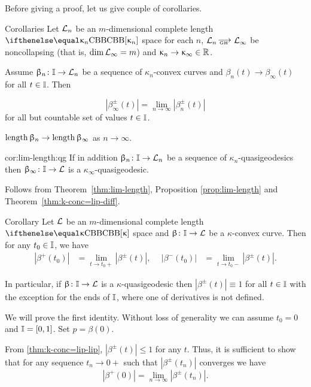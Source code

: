 Before giving a proof, let us give couple of corollaries. 

\begin{thm}{Corollaries}\label{cor:lim-length}
Let 
$\mathcal{L}_n$ be an $m$-dimensional complete length $\Alex{\kappa_n}$ space for each $n$, 
$\spc{L}_n\GHto \spc{L}_\infty$  be noncollapsing (that is, $\mathop{\rm dim}\nolimits\mathcal{L}_\infty=m$)
and $\kappa_n\to\kappa_\infty\in\RR$.

Assume $\beta_n\:\II\to \spc{L}_n$ be a sequence of $\kappa_n$-convex curves
and $\beta_n(t)\to \beta_\infty(t)$ for all $t\in\II$.
Then
\begin{subthm}{}
\[|\beta_\infty^\pm(t)|
=
\lim_{n\to\infty}|\beta_n^\pm(t)|\]
for all but countable set of values $t\in\II$.
\end{subthm}

\begin{subthm}{}
$\length\beta_n\to\length\beta_\infty$ as $n\to\infty$.
\end{subthm}

\begin{subthm}{cor:lim-length:qg}
If in addition $\beta_n\:\II\to \spc{L}_n$ be a sequence of $\kappa_n$-quasigeodesics
then $\beta_\infty\:\II\to \spc{L}$ is a $\kappa_\infty$-quasigeodesic.
\end{subthm}
\end{thm}

Follows from Theorem~\ref{thm:lim-length},
Proposition \ref{prop:lim-length} 
and Theorem~\ref{thm:k-conc=lip-diff}.
\qeds

\begin{thm}{Corollary}\label{cor:one-side-cont}\label{cor:|gamma'|=1}
Let $\mathcal{L}$ be an $m$-dimensional complete length $\Alex{\kappa}$ space
and $\beta\:\II\to \spc{L}$ be a $\kappa$-convex curve.
Then for any $t_0\in \II$, we have
\begin{align*}
|\beta^+(t_0)| &= \lim_{t\to t_0+}|\beta^\pm(t)|,\ \ &|\beta^-(t_0)| &= \lim_{t\to t_0-}|\beta^\pm(t)|.
\end{align*}

In particular, if $\beta\:\II\to \spc{L}$ is a $\kappa$-quasigeodesic then $|\beta^\pm(t)|\equiv1$ for all $t\in \II$ 
with the exception for the ends of $\mathbb{I}$, 
where one of derivatives is not defined.
\end{thm}

We will prove the first identity.
Without loss of generality we can assume $t_0=0$ and $\mathbb{I}=[0,1]$.
Set $p=\beta(0)$.

From \ref{thm:k-conc=lip-lip}, $|\beta^\pm(t)|\le 1$ for any $t$. 
Thus, it is sufficient to show that for any sequence $t_n\to0+$ such that $|\beta^\pm(t_n)|$ converges we have 
$$|\beta^+(0)|=\lim_{n\to\infty}|\beta^\pm(t_n)|.$$

